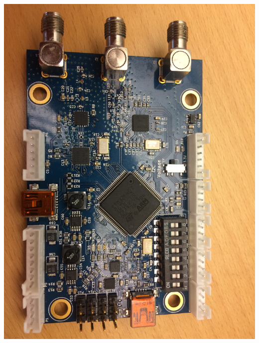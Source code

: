 \documentclass[12pt]{article} %
\begin{document}
\noindent \begin{minipage}{0.33\textwidth}
  \noindent \includegraphics[width=\textwidth]{./photos/RTKControl2.JPG}

\end{minipage}
\end{document}
